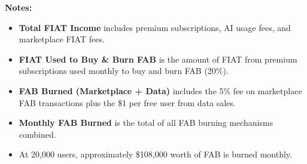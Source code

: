 \textbf{Notes:}
\begin{itemize}[leftmargin=*]
    \item \textbf{Total FIAT Income} includes premium subscriptions, AI usage fees, and marketplace FIAT fees.
    \item \textbf{FIAT Used to Buy \& Burn FAB} is the amount of FIAT from premium subscriptions used monthly to buy and burn FAB (20\%).
    \item \textbf{FAB Burned (Marketplace + Data)} includes the 5\% fee on marketplace FAB transactions plus the \$1 per free user from data sales.
    \item \textbf{Monthly FAB Burned} is the total of all FAB burning mechanisms combined.
    \item At 20,000 users, approximately \$108,000 worth of FAB is burned monthly.
\end{itemize} 